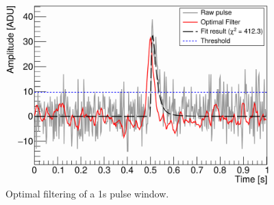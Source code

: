 \begin{figure}
\centering
\includegraphics[width=\linewidth,]{Figures/Neutron/pulse_of.png}
\caption{Optimal filtering of a 1s pulse window.}
\label{fig:pulse-of}
\end{figure}

